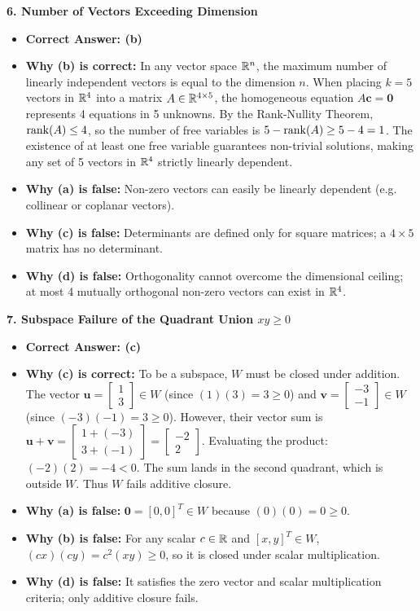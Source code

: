 \textbf{6. Number of Vectors Exceeding Dimension}
\begin{itemize}
    \item \textbf{Correct Answer: (b)}
    \item \textbf{Why (b) is correct:} In any vector space $\mathbb{R}^n$, the maximum number of linearly independent vectors is equal to the dimension $n$. When placing $k = 5$ vectors in $\mathbb{R}^4$ into a matrix $A \in \mathbb{R}^{4 \times 5}$, the homogeneous equation $A\mathbf{c} = \mathbf{0}$ represents 4 equations in 5 unknowns. By the Rank-Nullity Theorem, $\operatorname{rank}(A) \le 4$, so the number of free variables is $5 - \operatorname{rank}(A) \ge 5 - 4 = 1$. The existence of at least one free variable guarantees non-trivial solutions, making any set of 5 vectors in $\mathbb{R}^4$ strictly linearly dependent.
    \item \textbf{Why (a) is false:} Non-zero vectors can easily be linearly dependent (e.g. collinear or coplanar vectors).
    \item \textbf{Why (c) is false:} Determinants are defined only for square matrices; a $4 \times 5$ matrix has no determinant.
    \item \textbf{Why (d) is false:} Orthogonality cannot overcome the dimensional ceiling; at most 4 mutually orthogonal non-zero vectors can exist in $\mathbb{R}^4$.
\end{itemize}

\textbf{7. Subspace Failure of the Quadrant Union $xy \ge 0$}
\begin{itemize}
    \item \textbf{Correct Answer: (c)}
    \item \textbf{Why (c) is correct:} To be a subspace, $W$ must be closed under addition. The vector $\mathbf{u} = \begin{bmatrix} 1 \\ 3 \end{bmatrix} \in W$ (since $(1)(3) = 3 \ge 0$) and $\mathbf{v} = \begin{bmatrix} -3 \\ -1 \end{bmatrix} \in W$ (since $(-3)(-1) = 3 \ge 0$). However, their vector sum is $\mathbf{u} + \mathbf{v} = \begin{bmatrix} 1 + (-3) \\ 3 + (-1) \end{bmatrix} = \begin{bmatrix} -2 \\ 2 \end{bmatrix}$. Evaluating the product: $(-2)(2) = -4 < 0$. The sum lands in the second quadrant, which is outside $W$. Thus $W$ fails additive closure.
    \item \textbf{Why (a) is false:} $\mathbf{0} = [0, 0]^T \in W$ because $(0)(0) = 0 \ge 0$.
    \item \textbf{Why (b) is false:} For any scalar $c \in \mathbb{R}$ and $[x, y]^T \in W$, $(cx)(cy) = c^2 (xy) \ge 0$, so it is closed under scalar multiplication.
    \item \textbf{Why (d) is false:} It satisfies the zero vector and scalar multiplication criteria; only additive closure fails.
\end{itemize}

